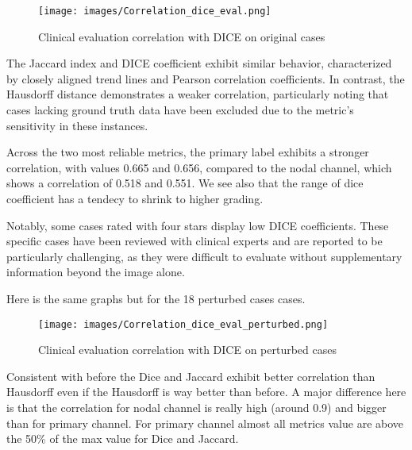 \begin{figure}[ht]
    \centering
    \texttt{[image: images/Correlation\_dice\_eval.png]}
    \caption{Clinical evaluation correlation with DICE on original cases}
    \label{fig:three_subfigures}
\end{figure}

The Jaccard index and DICE coefficient exhibit similar behavior, characterized by closely aligned trend lines and Pearson correlation coefficients. In contrast, the Hausdorff distance demonstrates a weaker correlation, particularly noting that cases lacking ground truth data have been excluded due to the metric's sensitivity in these instances.

Across the two most reliable metrics, the primary label exhibits a stronger correlation, with values 0.665 and 0.656, compared to the nodal channel, which shows a correlation of 0.518 and 0.551.
We see also that the range of dice coefficient has a tendecy to shrink to higher grading.

Notably, some cases rated with four stars display low DICE coefficients. These specific cases have been reviewed with clinical experts and are reported to be particularly challenging, as they were difficult to evaluate without supplementary information beyond the image alone.
\newpage 

Here is the same graphs but for the 18 perturbed cases cases.
\begin{figure}[ht]
    \centering
    \texttt{[image: images/Correlation\_dice\_eval\_perturbed.png]}
    \caption{Clinical evaluation correlation with DICE on perturbed cases}
    \label{fig:three_subfigures}
\end{figure}

Consistent with before the Dice and Jaccard exhibit better correlation than Hausdorff even if the Hausdorff is way better than before.
A major difference here is that the correlation for nodal channel is really high (around 0.9) and bigger than for primary channel.
For primary channel almost all metrics value are above the 50\% of the max value for Dice and Jaccard.
